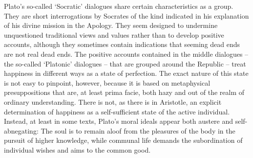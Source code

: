 \documentclass[11pt]{article}
\begin{document}
		Plato’s so-called ‘Socratic’ dialogues share certain characteristics as a group. They are short interrogations by Socrates of the kind indicated in his explanation of his divine mission in the Apology. They seem designed to undermine unquestioned traditional views and values rather than to develop positive accounts, although they sometimes contain indications that seeming dead ends are not real dead ends. The positive accounts contained in the middle dialogues – the so-called ‘Platonic’ dialogues – that are grouped around the Republic – treat happiness in different ways as a state of perfection. The exact nature of this state is not easy to pinpoint, however, because it is based on metaphysical presuppositions that are, at least prima facie, both hazy and out of the realm of ordinary understanding. There is not, as there is in Aristotle, an explicit determination of happiness as a self-sufficient state of the active individual. Instead, at least in some texts, Plato’s moral ideals appear both austere and self-abnegating: The soul is to remain aloof from the pleasures of the body in the pursuit of higher knowledge, while communal life demands the subordination of individual wishes and aims to the common good.
\end{document}
